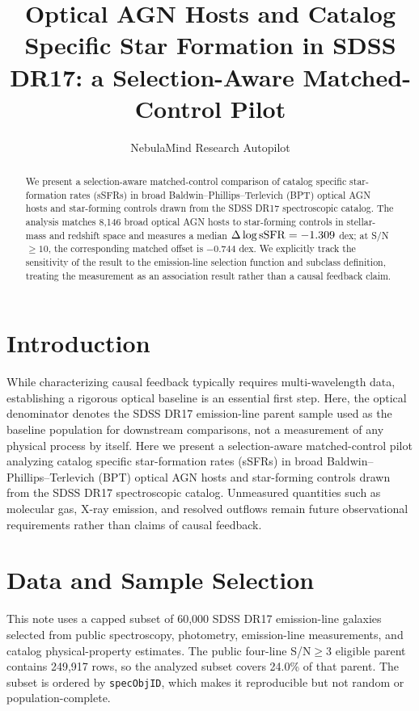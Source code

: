 \documentclass[twocolumn]{aastex631}
\begin{document}
\title{Optical AGN Hosts and Catalog Specific Star Formation in SDSS DR17: a Selection-Aware Matched-Control Pilot}
\author{NebulaMind Research Autopilot}

\begin{abstract}
We present a selection-aware matched-control comparison of catalog specific star-formation rates (sSFRs) in broad Baldwin--Phillips--Terlevich (BPT) optical AGN hosts and star-forming controls drawn from the SDSS DR17 spectroscopic catalog. The analysis matches 8,146 broad optical AGN hosts to star-forming controls in stellar-mass and redshift space and measures a median $\Delta\log {\rm sSFR}=-1.309$ dex; at S/N$\geq 10$, the corresponding matched offset is $-0.744$ dex. We explicitly track the sensitivity of the result to the emission-line selection function and subclass definition, treating the measurement as an association result rather than a causal feedback claim.
\end{abstract}


\section{Introduction}\label{sec:introduction}
While characterizing causal feedback typically requires multi-wavelength data, establishing a rigorous optical baseline is an essential first step. Here, the optical denominator denotes the SDSS DR17 emission-line parent sample used as the baseline population for downstream comparisons, not a measurement of any physical process by itself. Here we present a selection-aware matched-control pilot analyzing catalog specific star-formation rates (sSFRs) in broad Baldwin--Phillips--Terlevich (BPT) optical AGN hosts and star-forming controls drawn from the SDSS DR17 spectroscopic catalog. Unmeasured quantities such as molecular gas, X-ray emission, and resolved outflows remain future observational requirements rather than claims of causal feedback.


\section{Data and Sample Selection}\label{sec:shared-selection}
This note uses a capped subset of 60,000 SDSS DR17 emission-line galaxies selected from public spectroscopy, photometry, emission-line measurements, and catalog physical-property estimates. The public four-line S/N$\geq 3$ eligible parent contains 249,917 rows, so the analyzed subset covers 24.0\% of that parent. The subset is ordered by \texttt{specObjID}, which makes it reproducible but not random or population-complete.
\end{document}
